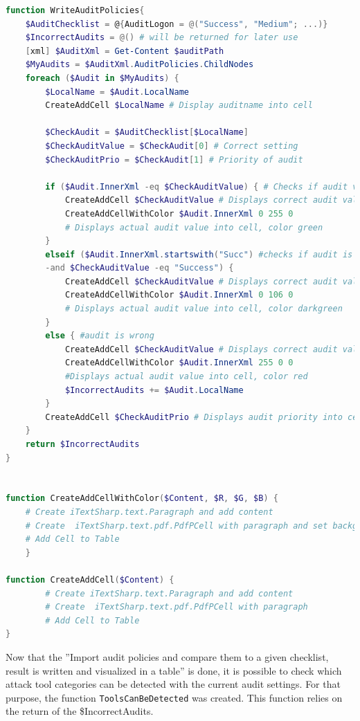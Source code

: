 \begin{lstlisting}[caption=Functions WriteAuditPolicies \& CreateAddCellWithColor \& CreateAddCell, language=PowerShell]
function WriteAuditPolicies{
    $AuditChecklist = @{AuditLogon = @("Success", "Medium"; ...)}
    $IncorrectAudits = @() # will be returned for later use
    [xml] $AuditXml = Get-Content $auditPath
    $MyAudits = $AuditXml.AuditPolicies.ChildNodes
    foreach ($Audit in $MyAudits) {
        $LocalName = $Audit.LocalName
        CreateAddCell $LocalName # Display auditname into cell

        $CheckAudit = $AuditChecklist[$LocalName]
        $CheckAuditValue = $CheckAudit[0] # Correct setting
        $CheckAuditPrio = $CheckAudit[1] # Priority of audit

        if ($Audit.InnerXml -eq $CheckAuditValue) { # Checks if audit values are equal
            CreateAddCell $CheckAuditValue # Displays correct audit value
            CreateAddCellWithColor $Audit.InnerXml 0 255 0 
            # Displays actual audit value into cell, color green  
        }
        elseif ($Audit.InnerXml.startswith("Succ") #checks if audit is ''overpowered''
        -and $CheckAuditValue -eq "Success") {
            CreateAddCell $CheckAuditValue # Displays correct audit value
            CreateAddCellWithColor $Audit.InnerXml 0 106 0 
            # Displays actual audit value into cell, color darkgreen
        }
        else { #audit is wrong
            CreateAddCell $CheckAuditValue # Displays correct audit value
            CreateAddCellWithColor $Audit.InnerXml 255 0 0 
            #Displays actual audit value into cell, color red
            $IncorrectAudits += $Audit.LocalName
        }
        CreateAddCell $CheckAuditPrio # Displays audit priority into cell
    }
    return $IncorrectAudits
}


function CreateAddCellWithColor($Content, $R, $G, $B) {
    # Create iTextSharp.text.Paragraph and add content
    # Create  iTextSharp.text.pdf.PdfPCell with paragraph and set backgroundcolor $R $G $B
    # Add Cell to Table
    }

function CreateAddCell($Content) {
        # Create iTextSharp.text.Paragraph and add content
        # Create  iTextSharp.text.pdf.PdfPCell with paragraph
        # Add Cell to Table
}
\end{lstlisting}
Now that the ''Import audit policies and compare them to a given checklist, result is written and visualized in a table'' is done, it is possible to check which attack tool categories can be detected with the current audit settings. For that purpose, the function \lstinline|ToolsCanBeDetected| was created. This function relies on the return of the \$IncorrectAudits.
